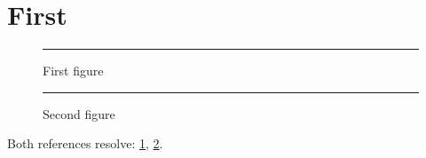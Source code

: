 \documentclass[cat,no-cover,no-toc,default]{P3CTeX}
\begin{document}
\section{First}
\begin{figure}[ht]
  \centering\rule{1cm}{1cm}
  \caption{First figure}\label{fig:first}
\end{figure}
\setcounter{figure}{0}
\begin{figure}[ht]
  \centering\rule{1cm}{1cm}
  \caption{Second figure}\label{fig:second}
\end{figure}
\makeatletter
{}
\makeatother
Both references resolve: \ref{fig:first}, \ref{fig:second}.
\end{document}
